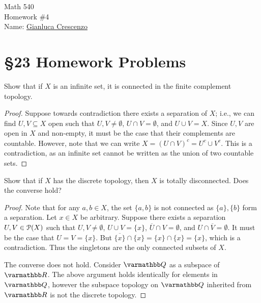 \documentclass[10pt,oneside,openany]{memoir}
\begin{document}
\begin{center}
    {\Large Math 540 \\[0.1in]Homework \#4}\\[.175in]
    {Name:} {\underline{Gianluca Crescenzo\hspace*{2in}}}\\[0.15in]
    \end{center}
    \vspace{4pt}
\section*{\S 23 Homework Problems}
\begin{exercise}[manual-num={4}]
Show that if $X$ is an infinite set, it is connected in the finite complement topology.
\end{exercise}
    \begin{proof}
        Suppose towards contradiction there exists a separation of $X$; i.e., we can find $U,V \subseteq X$ open such that $U,V \neq \emptyset$, $U \cap V = \emptyset$, and $U \cup V = X$. Since $U,V$ are open in $X$ and non-empty, it must be the case that their complements are countable. However, note that we can write $X = (U \cap V)^c = U^c \cup V^c$. This is a contradiction, as an infinite set cannot be written as the union of two countable sets.
    \end{proof}
\begin{exercise}[manual-num={5}]
Show that if $X$ has the discrete topology, then $X$ is totally disconnected. Does the converse hold?
\end{exercise}
    \begin{proof}
        Note that for any $a,b \in X$, the set $\{a,b\}$ is not connected as $\{a\},\{b\}$ form a separation. Let $x \in X$ be arbitrary. Suppose there exists a separation $U,V \in \mathcal{P}(X)$ such that $U,V \neq \emptyset$, $U \cup V = \{x\}$, $\overline{U} \cap V = \emptyset$, and $U \cap \overline{V} = \emptyset$. It must be the case that $U = V = \{x\}$. But $\overline{\{x\}} \cap \{x\} = \{x\} \cap \{x\} = \{x\}$, which is a contradiction. Thus the singletons are the only connected subsets of $X$.

        The converse does not hold. Consider $\bfQ$ as a subspace of $\bfR$. The above argument holds identically for elements in $\bfQ$, however the subspace topology on $\bfQ$ inherited from $\bfR$ is not the discrete topology.
    \end{proof}
\end{document}
